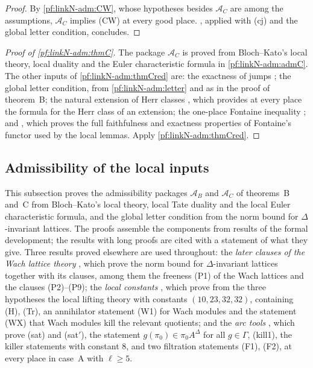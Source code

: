 \begin{proof}
By \cref{pf:linkN-adm:CW}, whose hypotheses besides $\mathcal A_C$ are among the assumptions, $\mathcal A_C$ implies (CW)
at every good place. , applied with (cj) and the global letter condition, concludes.
\end{proof}

\begin{proof}[Proof of \cref{pf:linkN-adm:thmC}]
The package $\mathcal A_C$ is proved from Bloch--Kato's local theory, local duality and the Euler characteristic formula in
\cref{pf:linkN-adm:admC}. The other inputs of \cref{pf:linkN-adm:thmCred} are:
the exactness of jumps ; the global letter condition, from
\cref{pf:linkN-adm:letter} and  as in the proof of theorem~B; the natural extension of Herr classes , which provides at
every place the formula for the Herr class of an extension; the one-place Fontaine inequality
; and
, which proves the full faithfulness and exactness properties of
Fontaine's functor used by the local lemmas. Apply \cref{pf:linkN-adm:thmCred}.
\end{proof}

\subsection{Admissibility of the local inputs}\label{pf:linkN-adm:admsec}

This subsection proves the admissibility packages $\mathcal A_B$ and $\mathcal A_C$ of theorems~B and~C from
Bloch--Kato's local theory, local Tate duality and the local Euler characteristic formula, and the global letter condition
from the norm bound for $\Delta$-invariant lattices. The proofs assemble the components from results of the formal
development; the results with long proofs are cited with a statement of what they give. Three results proved elsewhere are
used throughout: the \emph{later clauses of the Wach lattice theory}
, which prove the norm bound for $\Delta$-invariant lattices
together with its clauses, among them the freeness (P1) of the Wach lattices and the clauses (P2)--(P9); the \emph{local
constants} , which prove from the three
hypotheses the local lifting theory with constants $(10,23,32,32)$, containing (H), (Tr), an annihilator statement (W1) for
Wach modules and the statement (WX) that Wach modules kill the relevant quotients; and the \emph{arc tools}
, which prove (sat) and (sat$'$), the statement
$g(\pi_0)\in\pi_0A^\Delta$ for all $g\in\Gamma$, (kill1), the killer statements with constant $8$, and two filtration statements (F1), (F2),
at every place in case~A with $\ell\ge5$.

